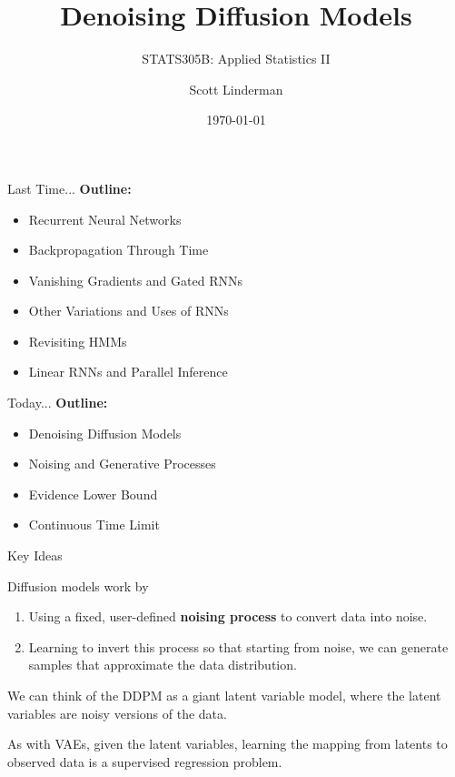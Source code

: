 \documentclass[aspectratio=169]{beamer}
\title{Denoising Diffusion Models}
\subtitle{STATS305B: Applied  Statistics II}
\author{Scott Linderman}
\date{\today}
\begin{document}
\maketitle


\begin{frame}{Last Time...}
    \textbf{Outline:}
    \begin{itemize}
        \item Recurrent Neural Networks
        \item Backpropagation Through Time
        \item Vanishing Gradients and Gated RNNs
        \item Other Variations and Uses of RNNs
        \item Revisiting HMMs
        \item Linear RNNs and Parallel Inference
    \end{itemize}
    \vspace{1em}
\end{frame}


\begin{frame}{Today...}
    \textbf{Outline:}
    \begin{itemize}
        \item Denoising Diffusion Models
        \item Noising and Generative Processes
        \item Evidence Lower Bound
        \item Continuous Time Limit
    \end{itemize}
    \vspace{1em}
\end{frame}


\begin{frame}[t,allowframebreaks]{Key Ideas}\label{key-ideas}

Diffusion models work by
\begin{enumerate}
\item  Using a fixed, user-defined \textbf{noising process} to convert data into noise. 
\item Learning to invert this process so that starting from noise, we can
generate samples that approximate the data distribution.
\end{enumerate}

We can think of the DDPM as a giant latent variable model, where the
latent variables are noisy versions of the data. 

As with VAEs, given the latent variables, learning the mapping from latents
to observed data is a supervised regression problem.

\end{frame}
\end{document}
